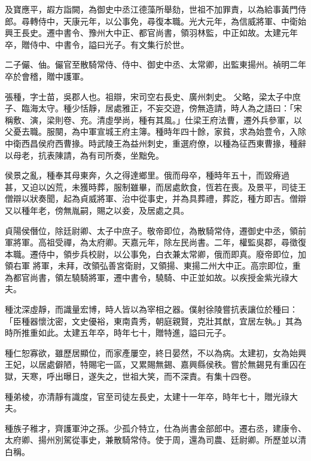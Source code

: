 \begin{pinyinscope}
 及寶應平，嘏方詣闕，為御史中丞江德藻所舉劾，世祖不加罪責，以為給事黃門侍郎。尋轉侍中，天康元年，以公事免，尋復本職。光大元年，為信威將軍、中衛始興王長史。遷中書令、豫州大中正、都官尚書，領羽林監，中正如故。太建元年卒，贈侍中、中書令，謚曰光子。有文集行於世。



 二子儼、伷。儼官至散騎常侍、侍中、御史中丞、太常卿，出監東揚州。禎明二年卒於會稽，贈中護軍。



 張種，字士苗，吳郡人也。祖辯，宋司空右長史、廣州刺史。
 父略，梁太子中庶子、臨海太守。種少恬靜，居處雅正，不妄交遊，傍無造請，時人為之語曰：「宋稱敷、演，梁則卷、充。清虛學尚，種有其風。」仕梁王府法曹，遷外兵參軍，以父憂去職。服闋，為中軍宣城王府主簿。種時年四十餘，家貧，求為始豊令，入除中衛西昌侯府西曹掾。時武陵王為益州刺史，重選府僚，以種為征西東曹掾，種辭以母老，抗表陳請，為有司所奏，坐黜免。



 侯景之亂，種奉其母東奔，久之得達鄉里。俄而母卒，種時年五十，而毀瘠過
 甚，又迫以凶荒，未獲時葬，服制雖畢，而居處飲食，恆若在喪。及景平，司徒王僧辯以狀奏聞，起為貞威將軍、治中從事史，并為具葬禮，葬訖，種方即吉。僧辯又以種年老，傍無胤嗣，賜之以妾，及居處之具。



 貞陽侯僭位，除廷尉卿、太子中庶子。敬帝即位，為散騎常侍，遷御史中丞，領前軍將軍。高祖受禪，為太府卿。天嘉元年，除左民尚書。二年，權監吳郡，尋徵復本職。遷侍中，領步兵校尉，以公事免，白衣兼太常卿，俄而即真。廢帝即位，加領右軍
 將軍，未拜，改領弘善宮衛尉，又領揚、東揚二州大中正。高宗即位，重為都官尚書，領左驍騎將軍，遷中書令，驍騎、中正並如故。以疾授金紫光祿大夫。



 種沈深虛靜，而識量宏博，時人皆以為宰相之器。僕射徐陵嘗抗表讓位於種曰：「臣種器懷沈密，文史優裕，東南貴秀，朝庭親賢，克壯其猷，宜居左執。」其為時所推重如此。太建五年卒，時年七十，贈特進，謚曰元子。



 種仁恕寡欲，雖歷居顯位，而家產屢空，終日晏然，不以為病。太建初，女為始興
 王妃，以居處僻陋，特賜宅一區，又累賜無錫、嘉興縣侯秩。嘗於無錫見有重囚在獄，天寒，呼出曝日，遂失之，世祖大笑，而不深責。有集十四卷。



 種弟棱，亦清靜有識度，官至司徒左長史，太建十一年卒，時年七十，贈光祿大夫。



 種族子稚才，齊護軍沖之孫。少孤介特立，仕為尚書金部郎中。遷右丞，建康令、太府卿、揚州別駕從事史，兼散騎常侍。使于周，還為司農、廷尉卿。所歷並以清白稱。




\end{pinyinscope}
